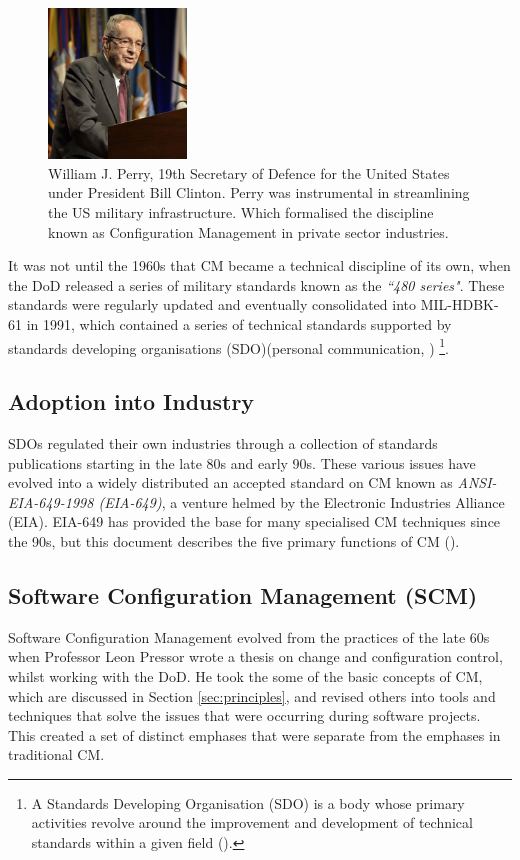 \documentclass[cmpstyle]{ueacmpstyle}
\begin{document}
		\begin{figure}
			\centering
			\includegraphics[height=4cm]{images/william-perry.jpg}
			\caption{William J. Perry, 19th Secretary of Defence for the United States under President Bill Clinton. Perry was instrumental in streamlining the US military infrastructure. Which formalised the discipline known as Configuration Management in private sector industries.} \label{fig:william}
		\end{figure}
	
		It was not until the 1960s that CM became a technical discipline of its own, when the DoD released a series of military standards known as the \emph{``480 series"}. These standards were regularly updated and eventually consolidated into MIL-HDBK-61 in 1991, which contained a series of technical standards supported by standards developing organisations (SDO)(personal communication, \cite{dod-history}) \footnote{A Standards Developing Organisation (SDO) is a body whose primary activities revolve around the improvement and development of technical standards within a given field (\cite{history-standards}).}.
		
		\subsection{Adoption into Industry} \label{sec:adoption}
		SDOs regulated their own industries through a collection of standards publications starting in the late 80s and early 90s. These various issues have evolved into a widely distributed an accepted standard on CM known as \emph{ANSI-EIA-649-1998 (EIA-649)}, a venture helmed by the Electronic Industries Alliance (EIA). EIA-649 has provided the base for many specialised CM techniques since the 90s, but this document describes the five primary functions of CM (\cite{EIA-649}). 
		
		\subsection{Software Configuration Management (SCM)} \label{sec:scm}
		Software Configuration Management evolved from the practices of the late 60s when Professor Leon Pressor wrote a thesis on change and configuration control, whilst working with the DoD. He took the some of the basic concepts of CM, which are discussed in Section \ref{sec:principles}, and revised others into tools and techniques that solve the issues that were occurring during software projects. This created a set of distinct emphases that were separate from the emphases in traditional CM.
		
\end{document}
